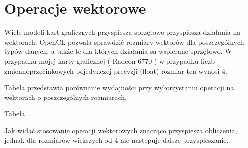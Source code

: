 
\section { Operacje wektorowe }

Wiele modeli kart graficznych przyspiesza sprzętowo przyspiesza działania na wektorach. OpenCL pozwala sprawdzić rozmiary wektorów dla poszczególnych typów danych, a także te dla których działania są wspierane sprzętowo. W przypadku mojej karty graficznej ( Radeon 6770 ) w przypadku liczb zmiennoprzecinkowych pojedynczej precyzji (float) rozmiar ten wynosi 4.

Tabela przedstawia porównanie wydajności przy wykorzystaniu operacji na wektorach o poszczególnych rozmiarach. \linebreak

Tabela \linebreak

Jak widać stosowanie operacji wektorowych znacząco przyspiesza obliczenia, jednak dla rozmiarów większych od 4 nie następuje dalsze przyspieszanie.